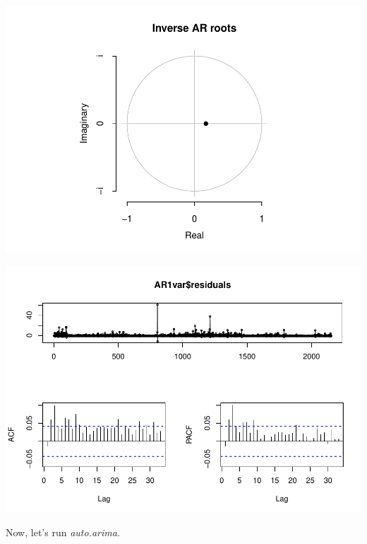 \documentclass[11pt, a4paper]{report}
\newenvironment{Shaded}{\begin{snugshade}}{\end{snugshade}}
\newcommand{\DataTypeTok}[1]{\textcolor[rgb]{0.13,0.29,0.53}{#1}}
\newcommand{\KeywordTok}[1]{\textcolor[rgb]{0.13,0.29,0.53}{\textbf{#1}}}
\newcommand{\NormalTok}[1]{#1}
\newcommand{\OperatorTok}[1]{\textcolor[rgb]{0.81,0.36,0.00}{\textbf{#1}}}
\newcommand{\StringTok}[1]{\textcolor[rgb]{0.31,0.60,0.02}{#1}}
\theoremstyle{plain}
\theoremstyle{plain}
\theoremstyle{remark}
\begin{document}
\begin{center}\includegraphics{Econo2_P1_files/figure-latex/var1-1} \end{center}

\begin{Shaded}
\end{Shaded}

\begin{center}\includegraphics{Econo2_P1_files/figure-latex/var1-2} \end{center}

Now, let's run \emph{auto.arima}.

\begin{Shaded}
\end{Shaded}
\end{document}
